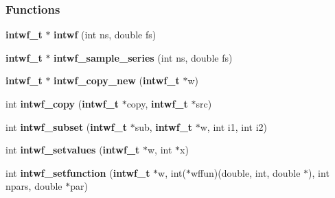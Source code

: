 \subsubsection*{Functions}
\begin{CompactItemize}
\item 
{\bf intwf\_\-t} $\ast$ {\bf intwf} (int ns, double fs)
\item 
{\bf intwf\_\-t} $\ast$ {\bf intwf\_\-sample\_\-series} (int ns, double fs)
\item 
{\bf intwf\_\-t} $\ast$ {\bf intwf\_\-copy\_\-new} ({\bf intwf\_\-t} $\ast$w)
\item 
int {\bf intwf\_\-copy} ({\bf intwf\_\-t} $\ast$copy, {\bf intwf\_\-t} $\ast$src)
\item 
int {\bf intwf\_\-subset} ({\bf intwf\_\-t} $\ast$sub, {\bf intwf\_\-t} $\ast$w, int i1, int i2)
\item 
int {\bf intwf\_\-setvalues} ({\bf intwf\_\-t} $\ast$w, int $\ast$x)
\item 
int \textbf{intwf\_\-setfunction} ({\bf intwf\_\-t} $\ast$w, int($\ast$wffun)(double, int, double $\ast$), int npars, double $\ast$par)\label{intwf_8c_759d86cbc367a459aa6c593d381a2e48}


\end{CompactItemize}
